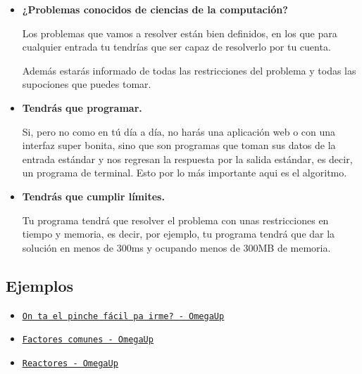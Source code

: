 \documentclass[12pt, fleqn]{report}                             %
\newcommand \Link[2] {\underline{\texttt{\href{#1}{#2}}}}       %
\theoremstyle{break}                                            %
\begin{document}
            \begin{itemize}
                \item \textbf{¿Problemas conocidos de ciencias de la computación?}
                
                    Los problemas que vamos a resolver están bien definidos, en los que para cualquier
                    entrada tu tendrías que ser capaz de resolverlo por tu cuenta.

                    Además estarás informado de todas las restricciones del problema y todas las 
                    supociones que puedes tomar.

                \item \textbf{Tendrás que programar.}
                
                    Si, pero no como en tú día a día, no harás una aplicación web o con una interfaz
                    super bonita, sino que son programas que toman sus datos de la entrada estándar
                    y nos regresan la respuesta por la salida estándar, es decir, un programa 
                    de terminal. Esto por lo más importante aqui es el algoritmo.

                \item \textbf{Tendrás que cumplir límites.}
                
                    Tu programa tendrá que resolver el problema con unas restricciones
                    en tiempo y memoria, es decir, por ejemplo, tu programa tendrá que dar la
                    solución en menos de 300ms y ocupando menos de 300MB de memoria.

            \end{itemize}

            \subsection{Ejemplos}

                \begin{itemize}
                    \item 
                        \Link{https://omegaup.com/arena/problem/On-ta-el-pinche-facil-pa-irme}
                        {On ta el pinche fácil pa irme? -  OmegaUp}
                    \item 
                        \Link{https://omegaup.com/arena/problem/factorescomunes}
                        {Factores comunes - OmegaUp}
                    \item 
                        \Link{https://omegaup.com/arena/problem/Reactores}
                        {Reactores - OmegaUp}
                \end{itemize}
\end{document}
